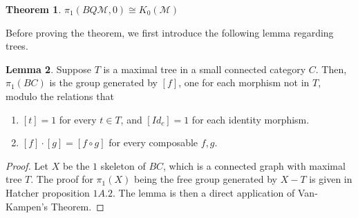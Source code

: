 \documentclass{article}
\theoremstyle{definition}
\newtheorem{theorem}{Theorem}[section]
\theoremstyle{definition}
\theoremstyle{definition}
\theoremstyle{definition}
\theoremstyle{definition}
\newtheorem{lemma}[theorem]{Lemma}
\theoremstyle{definition}
\theoremstyle{definition}
\begin{document}
\begin{tcolorbox}[colback=red!5!white,colframe=red!30!white]
\begin{theorem}
$\pi_1(BQ\mathcal{M},0)\cong K_0(\mathcal{M})$
\end{theorem}
\end{tcolorbox}

Before proving the theorem, we first introduce the following lemma regarding trees.

\begin{tcolorbox}
\begin{lemma}
    Suppose $T$ is a maximal tree in a small connected category $C$. Then, $\pi_1(BC)$ is the group generated by $[f]$, one for each morphism not in $T$, modulo the relations that \begin{enumerate}
        \item  $[t]=1$ for every $t\in T$, and $[Id_c]=1$ for each identity morphism.
        \item $[f]\cdot [g]=[f\circ g]$ for every composable $f,g$.
    \end{enumerate}
\end{lemma}
\end{tcolorbox}
\begin{proof}
  Let $X$ be the $1$ skeleton of $BC$, which is a connected graph with maximal tree $T$.  The proof for $\pi_1(X)$ being the free group generated by $X-T$ is given in Hatcher proposition $1A.2$. The lemma is then a direct application of Van-Kampen's Theorem. 
\end{proof}
\end{document}
